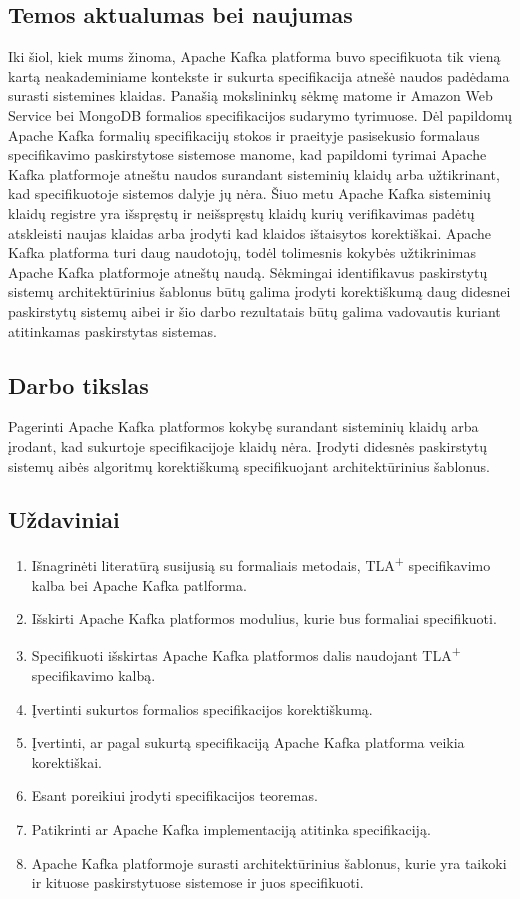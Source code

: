 \documentclass{VUMIFPSmagistrinis}
\begin{document}
	\subsection{Temos aktualumas bei naujumas}
		Iki šiol, kiek mums žinoma, Apache Kafka platforma buvo specifikuota tik vieną kartą neakademiniame kontekste ir sukurta specifikacija atnešė naudos padėdama surasti sistemines klaidas.
		Panašią mokslininkų sėkmę matome ir Amazon Web Service bei MongoDB formalios specifikacijos sudarymo tyrimuose.
		Dėl papildomų Apache Kafka formalių specifikacijų stokos ir praeityje pasisekusio formalaus specifikavimo paskirstytose sistemose manome, kad papildomi tyrimai Apache Kafka platformoje atneštu naudos surandant sisteminių klaidų arba užtikrinant, kad specifikuotoje sistemos dalyje jų nėra.
		Šiuo metu Apache Kafka sisteminių klaidų registre yra išspręstų  ir neišspręstų  klaidų kurių verifikavimas padėtų atskleisti naujas klaidas arba įrodyti kad klaidos ištaisytos korektiškai.
		Apache Kafka platforma turi daug naudotojų, todėl tolimesnis kokybės užtikrinimas Apache Kafka platformoje atneštų naudą.
		Sėkmingai identifikavus paskirstytų sistemų architektūrinius šablonus būtų galima įrodyti korektiškumą daug didesnei paskirstytų sistemų aibei ir šio darbo rezultatais būtų galima vadovautis kuriant atitinkamas paskirstytas sistemas. 
	
	\subsection{Darbo tikslas}
		Pagerinti Apache Kafka platformos kokybę surandant sisteminių klaidų arba įrodant, kad sukurtoje specifikacijoje klaidų nėra.
		Įrodyti didesnės paskirstytų sistemų aibės algoritmų korektiškumą specifikuojant architektūrinius šablonus.
	
	\subsection{Uždaviniai}
		\begin{enumerate}
			\item{Išnagrinėti literatūrą susijusią su formaliais metodais, TLA\textsuperscript{+} specifikavimo kalba bei Apache Kafka patlforma.}
			\item{Išskirti Apache Kafka platformos modulius, kurie bus formaliai specifikuoti.}
			\item{Specifikuoti išskirtas Apache Kafka platformos dalis naudojant TLA\textsuperscript{+} specifikavimo kalbą.}
			\item{Įvertinti sukurtos formalios specifikacijos korektiškumą.}
			\item{Įvertinti, ar pagal sukurtą specifikaciją Apache Kafka platforma veikia korektiškai.}
			\item{Esant poreikiui įrodyti specifikacijos teoremas.}
			\item{Patikrinti ar Apache Kafka implementaciją atitinka specifikaciją.}
			\item{Apache Kafka platformoje surasti architektūrinius šablonus, kurie yra taikoki ir kituose paskirstytuose sistemose ir juos specifikuoti.}
		\end{enumerate}
	
\end{document}
